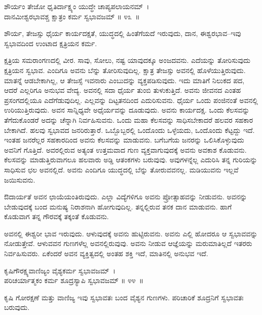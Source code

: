 \begin{shloka}
ಶೌರ್ಯಂ ತೇಜೋ ಧೃತಿರ್ದಾಕ್ಷ್ಯಂ ಯುದ್ಧೇ ಚಾಪ್ಯಪಲಾಯನಮ್~।\\ದಾನಮೀಶ್ವರಭಾವಶ್ಚ ಕ್ಷಾತ್ರಂ ಕರ್ಮ ಸ್ವಭಾವಜಮ್ \hfill॥ ೪೩~॥
\end{shloka}

\begin{artha}
ಶೌರ್ಯ, ತೇಜಸ್ಸು ಧೈರ್ಯ ಕಾರ್ಯದಕ್ಷತೆ, ಯುದ್ಧದಲ್ಲಿ ಹಿಂತೆಗೆಯದೆ ಇರುವುದು, ದಾನ, ಈಶ್ವರಭಾವ–ಇವು ಸ್ವಭಾವದಿಂದ ಉಂಟಾದ ಕ್ಷತ್ರಿಯನ ಕರ್ಮ.
\end{artha}

ಕ್ಷತ್ರಿಯ ಸಮರಾಂಗಣದಲ್ಲಿ ವೀರ. ಸಾವು, ಸೋಲು, ನಷ್ಟ ಯಾವುದಕ್ಕೂ ಅಂಜದವನು. ಎದೆಯನ್ನು ತೋರಿಸುವುದು ಕ್ಷತ್ರಿಯನ ಸ್ವಭಾವ. ಎಂದಿಗೂ ಅವನು ಬೆನ್ನು ತೋರಿಸುವುದಿಲ್ಲ. ಕ್ಷಾತ್ರ ತೇಜಸ್ಸು ಅವನಲ್ಲಿ ಹೊಳೆಯುತ್ತಿರುವುದು. ಮಾತನ್ನೆ ಆಡಬೇಕಾಗಿಲ್ಲ, ಆ ತೇಜಸ್ಸೆ ಇವನಾರು ಎಂಬುದನ್ನು ವ್ಯಕ್ತಪಡಿಸುವುದು. ಇದು ಮಾತಿಗೆ ನಿಲುಕದ ಪದ, ಆದರೆ ಎಲ್ಲರಿಗೂ ಅನುಭವ ವೇದ್ಯ. ಅವನಲ್ಲಿ ಸದಾ ಧೈರ್ಯ ತುಂಬಿ ತುಳುಕುತ್ತಿದೆ. ಅವನು ಜೀವನದ ಎಂತಹ ಪ್ರಸಂಗದಲ್ಲಿಯೂ ಎದೆಗೆಡುವುದಿಲ್ಲ. ಎಲ್ಲವನ್ನು ದಿಟ್ಟತನದಿಂದ ಎದುರಿಸುವನು. ಧೈರ್ಯ ಒಂದು ಪಂಜಿನಂತೆ ಅವನಲ್ಲಿ ಉರಿಯುತ್ತಿರುವುದು. ಅವನ ಸಾನ್ನಿಧ್ಯವೇ ಅಧೈರ್ಯವನ್ನು ದೂಡುವುದು. ಅವನು ಕಾರ್ಯದಕ್ಷ. ಒಂದು ಕೆಲಸವನ್ನು ತೆಗೆದುಕೊಂಡರೆ ಅದನ್ನು ಚೆನ್ನಾಗಿ ನಿರ್ವಹಿಸುವನು. ಒಂದು ಮಹಾ ಕೆಲಸವನ್ನು ಸಾಧಿಸಬೇಕಾದರೆ ಹಲವರ ಸಹಕಾರ ಬೇಕಾಗಿದೆ. ಹಲವು ಸ್ವಭಾವದ ಜನರಿರುತ್ತಾರೆ. ಒಬ್ಬೊಬ್ಬರಲ್ಲಿ ಒಂದೊಂದು ಒಳ್ಳೆಯದು, ಒಂದೊಂದು ಕೆಟ್ಟದ್ದು ಇದೆ. ಇಂತಹ ಜನರೆಲ್ಲರ ಸಹಕಾರದಿಂದ ಅವನು ಕೆಲಸವನ್ನು ಮಾಡುವನು. ಬಗೆಬಗೆಯ ಜನರನ್ನು ಒಲಿಸಿಕೊಳ್ಳುವುದು ಅವನಿಗೆ ಗೊತ್ತಿದೆ. ಅವರಲ್ಲಿರುವ ಅತ್ಯಂತ ಉತ್ತಮವಾದ ಗುಣ ವ್ಯಕ್ತವಾಗುವುದಕ್ಕೆ ಅವನು ಅವಕಾಶ ಕೊಡುವನು. ಕೆಲಸವನ್ನು ಮಾಡುತ್ತಿರುವಾಗಲೂ ಹಲವಾರು ಅಡ್ಡಿ ಆತಂಕಗಳು ಬರುವುವು. ಅವುಗಳನ್ನೆಲ್ಲ ಎದುರಿಸಿ ತನ್ನ ಗುರಿಯನ್ನು ಸಾಧಿಸುವ ಛಲ ಅವನಲ್ಲಿದೆ. ಅವನು ಎಂದಿಗೂ ಯುದ್ಧದಲ್ಲಿ ಬೆನ್ನು ತೋರುವವನಲ್ಲ. ಮಡಿಯುವನು ಇಲ್ಲವೆ ಜಯಿಸುವನು.

ಔದಾರ್ಯತೆ ಅವನ ಛಾಯೆಯಂತಿರುವುದು. ಎಲ್ಲಾ ವಿದ್ಯೆಗಳಿಗೂ ಅವನು ಪ್ರೋತ್ಸಾಹವನ್ನು ನೀಡುವನು. ಅವನನ್ನು ಬೇಡುವುದಕ್ಕೆ ಬಂದ ಮನುಷ್ಯ ನಿರಾಶನಾಗಿ ಹೋಗುವುದಿಲ್ಲ. ತನ್ನಲ್ಲಿರುವ ತನಕ ದಾನ ಮಾಡುವನು. ಹಾಗೆ ಕೊಡುವಾಗ ತನ್ನ ಗೌರವಕ್ಕೆ ತಕ್ಕಂತೆ ಕೊಡುವನು.

ಅವನಲ್ಲಿ ಈಶ್ವರೀ ಭಾವ ಇರುವುದು. ಆಳುವುದಕ್ಕೆ ಅವನು ಹುಟ್ಟಿರುವನು. ಅವನು ಎಲ್ಲಿ ಹೋದರೂ ಆ ಸ್ವಭಾವವನ್ನು ನೋಡುತ್ತೇವೆ. ಆಳುವವನ ಗುಣಗಳೆಲ್ಲ ಅವನಲ್ಲಿರುವುವು. ಅವನು ನೀಡುವ ಆಜ್ಞೆಯನ್ನು ಮರುಮಾತಿಲ್ಲದೆ ಇತರರು ನಿರ್ವಹಿಸುವರು. ಏಕೆಂದರೆ ಅವನ ವ್ಯಕ್ತಿತ್ವದಲ್ಲಿ ಅಂತಹ ಶಕ್ತಿ ಇದೆ, ಮಾತಿನಲ್ಲಿ ಅನುಭವ ಇದೆ.

\begin{shloka}
ಕೃಷಿಗೌರಕ್ಷ್ಯವಾಣಿಜ್ಯಂ ವೈಶ್ಯಕರ್ಮ ಸ್ವಭಾವಜಮ್~।\\ಪರಿಚರ್ಯಾತ್ಮಕಂ ಕರ್ಮ ಶೂದ್ರಸ್ಯಾಪಿ ಸ್ವಭಾವಜಮ್ \hfill॥ ೪೪~॥
\end{shloka}

\begin{artha}
ಕೃಷಿ ಗೋರಕ್ಷಣೆ ಮತ್ತು ವಾಣಿಜ್ಯ ಇವು ಸ್ವಭಾವತಃ ಬಂದ ವೈಶ್ಯನ ಗುಣಗಳು. ಪರಿಚಾರಿಕೆ ಶೂದ್ರನಿಗೆ ಸ್ವಭಾವತಃ ಬರುವುದು.
\end{artha}

